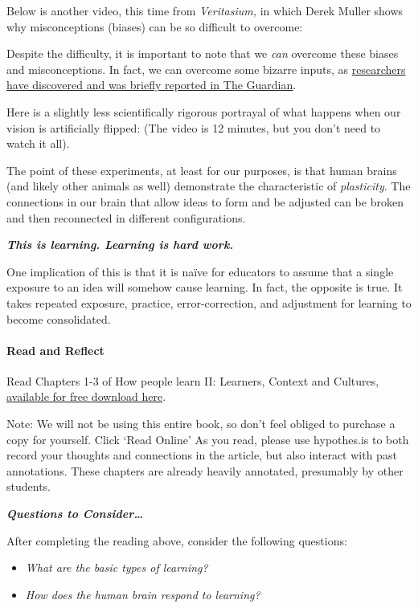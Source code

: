 \documentclass[
]{book}
\providecommand{\tightlist}{%
  \setlength{\itemsep}{0pt}\setlength{\parskip}{0pt}}
\begin{document}
Below is another video, this time from \emph{Veritasium,} in which Derek Muller shows why misconceptions (biases) can be so difficult to overcome:

Despite the difficulty, it is important to note that we \emph{can} overcome these biases and misconceptions. In fact, we can overcome some bizarre inputs, as \href{https://www.theguardian.com/education/2012/nov/12/improbable-research-seeing-upside-down}{researchers have discovered and was briefly reported in The Guardian}.

Here is a slightly less scientifically rigorous portrayal of what happens when our vision is artificially flipped: (The video is 12 minutes, but you don't need to watch it all).

The point of these experiments, at least for our purposes, is that human brains (and likely other animals as well) demonstrate the characteristic of \emph{plasticity}. The connections in our brain that allow ideas to form and be adjusted can be broken and then reconnected in different configurations.

\textbf{\emph{This is learning. Learning is hard work.}}

One implication of this is that it is naïve for educators to assume that a single exposure to an idea will somehow cause learning. In fact, the opposite is true. It takes repeated exposure, practice, error-correction, and adjustment for learning to become consolidated.

\begin{reflect}
\hypertarget{read-and-reflect}{%
\paragraph{Read and Reflect}\label{read-and-reflect}}

Read Chapters 1-3 of How people learn II: Learners, Context and
Cultures, \href{https://www.nap.edu/catalog/24783}{available for free
download here}.

Note: We will not be using this entire book, so don't feel obliged to
purchase a copy for yourself. Click `Read Online' As you read, please
use hypothes.is to both record your thoughts and connections in the
article, but also interact with past annotations. These chapters are
already heavily annotated, presumably by other students.

\textbf{\emph{Questions to Consider\ldots{}}}

After completing the reading above, consider the following questions:

\begin{itemize}
\tightlist
\item
  \emph{What are the basic types of learning?}
\item
  \emph{How does the human brain respond to learning?}
\end{itemize}
\end{reflect}
\end{document}
